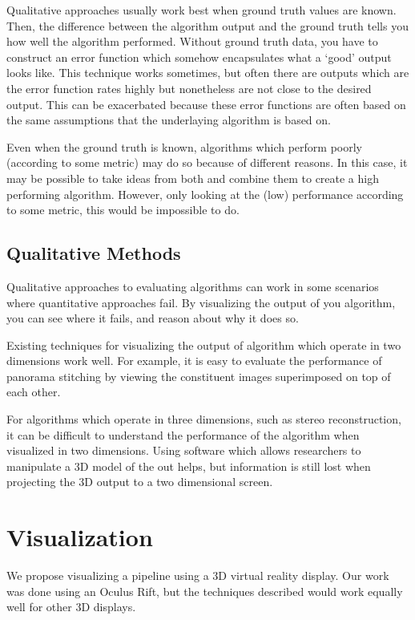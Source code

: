 \documentclass[10pt,twocolumn,letterpaper]{article}
\begin{document}
Qualitative approaches usually work best when ground truth values are known. Then, the difference between the algorithm output and the ground truth tells you how well the algorithm performed. Without ground truth data, you have to construct an error function which somehow encapsulates what a `good' output looks like. This technique works sometimes, but often there are outputs which are the error function rates highly but nonetheless are not close to the desired output. This can be exacerbated because these error functions are often based on the same assumptions that the underlaying algorithm is based on.

Even when the ground truth is known, algorithms which perform poorly (according to some metric) may do so because of different reasons. In this case, it may be possible to take ideas from both and combine them to create a high performing algorithm. However, only looking at the (low) performance according to some metric, this would be impossible to do.

\subsection{Qualitative Methods}

Qualitative approaches to evaluating algorithms can work in some scenarios where quantitative approaches fail. By visualizing the output of you algorithm, you can see where it fails, and reason about why it does so.

Existing techniques for visualizing the output of algorithm which operate in two dimensions work well. For example, it is easy to evaluate the performance of panorama stitching by viewing the constituent images superimposed on top of each other.

For algorithms which operate in three dimensions, such as stereo reconstruction, it can be difficult to understand the performance of the algorithm when visualized in two dimensions. Using software which allows researchers to manipulate a 3D model of the out helps, but information is still lost when projecting the 3D output to a two dimensional screen.


\section{Visualization}
We propose visualizing a pipeline using a 3D virtual reality display. Our work was done using an Oculus Rift, but the techniques described would work equally well for other 3D displays.
\end{document}
